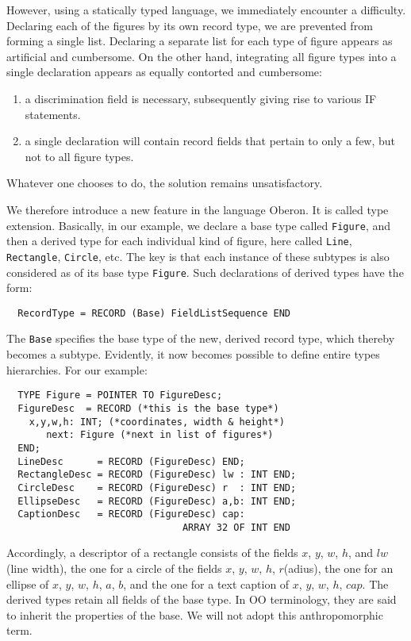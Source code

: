 However, using a statically typed language, we immediately encounter a difficulty. Declaring each of
the figures by its own record type, we are prevented from forming a single list. Declaring a separate
list for each type of figure appears as artificial and cumbersome. On the other hand, integrating all
figure types into a single declaration appears as equally contorted and cumbersome:
\begin{enumerate}
  \item a discrimination field is necessary, subsequently giving rise to various IF statements.
  \item a single declaration will contain record fields that pertain to only a few, but not to all
    figure types.
\end{enumerate}
Whatever one chooses to do, the solution remains unsatisfactory.

We therefore introduce a new feature in the language Oberon. It is called type extension. Basically,
in our example, we declare a base type called \verb|Figure|, and then a derived type for each
individual kind of figure, here called \verb|Line|, \verb|Rectangle|, \verb|Circle|, etc. The key
is that each instance of these subtypes is also considered as of its base type \verb|Figure|. Such
declarations of derived types have the form:
\begin{verbatim}
  RecordType = RECORD (Base) FieldListSequence END
\end{verbatim}
The \verb|Base| specifies the base type of the new, derived record type, which thereby becomes a
subtype. Evidently, it now becomes possible to define entire types hierarchies. For our example:
\begin{verbatim}
  TYPE Figure = POINTER TO FigureDesc;
  FigureDesc  = RECORD (*this is the base type*)
    x,y,w,h: INT; (*coordinates, width & height*)
       next: Figure (*next in list of figures*)
  END;
  LineDesc      = RECORD (FigureDesc) END;
  RectangleDesc = RECORD (FigureDesc) lw : INT END;
  CircleDesc    = RECORD (FigureDesc) r  : INT END;
  EllipseDesc   = RECORD (FigureDesc) a,b: INT END;
  CaptionDesc   = RECORD (FigureDesc) cap:
                               ARRAY 32 OF INT END
\end{verbatim}
Accordingly, a descriptor of a rectangle consists of the fields $x$, $y$, $w$, $h$, and $lw$ (line width),
the one for a circle of the fields $x$, $y$, $w$, $h$, $r$(adius), the one for an ellipse of $x$, $y$,
$w$, $h$, $a$, $b$, and the one for a text caption of $x$, $y$, $w$, $h$, $cap$. The derived types retain
all fields of the base type. In OO terminology, they are said to inherit the properties of the base. We
will not adopt this anthropomorphic term.

